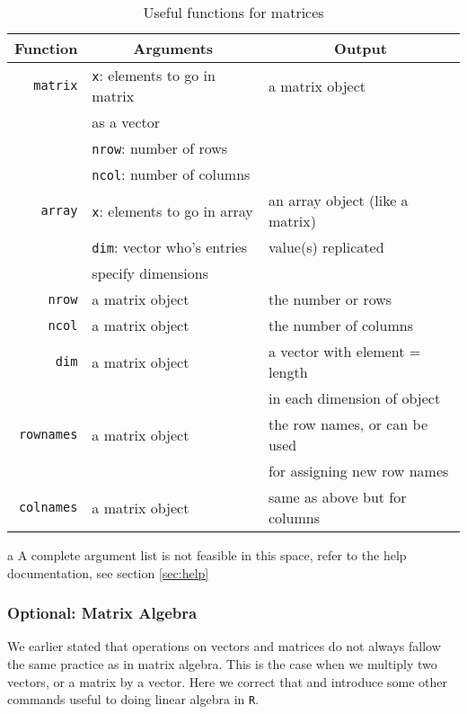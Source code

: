 \documentclass[12pt]{article}
\begin{document}
\begin{table}[!htb]
	\begin{threeparttable}
	\caption{Useful functions for matrices}

	\begin{tabular}{r l l}
		\hline
		Function 	&	\multicolumn{1}{c}{Arguments\tnote{a}}		&	\multicolumn{1}{c}{Output}		\\
		\hline
		\verb+matrix+	&	\verb+x+: elements to go in matrix		&	a matrix object					\\
					&	as a vector						&								\\
					&	\verb+nrow+: number of rows			&								\\
					&	\verb+ncol+: number of columns		&								\\
		\verb+array+	&	\verb+x+: elements to go in array		&	an array object (like a matrix)		\\
					&	\verb+dim+: vector who's entries		&	value(s) replicated				\\
					&	specify dimensions					&								\\
		\verb+nrow+	&	a matrix object						&	the number or rows				\\
		\verb+ncol+	&	a matrix object						&	the number of columns			\\
		\verb+dim+	&	a matrix object						&	a vector with element = length		\\
					&									&	in each dimension of object		\\
		\verb+rownames+&	a matrix object						&	the row names, or can be used		\\
					&									&	for assigning new row names		\\
		\verb+colnames+&	a matrix object						&	same as above but for columns	\\
		\hline
	\end{tabular}
	\begin{tablenotes}
		\item[a] A complete argument list is not feasible in this space, refer to the help documentation, see section \ref{sec:help}
	\end{tablenotes}
	\end{threeparttable}
\end{table}

\subsubsection*{Optional: Matrix Algebra}
We earlier stated that operations on vectors and matrices do not always fallow the same practice as in matrix algebra.  This is the case when we multiply two vectors, or a matrix by a vector.  Here we correct that and introduce some other commands useful to doing linear algebra in \verb+R+.
\end{document}
